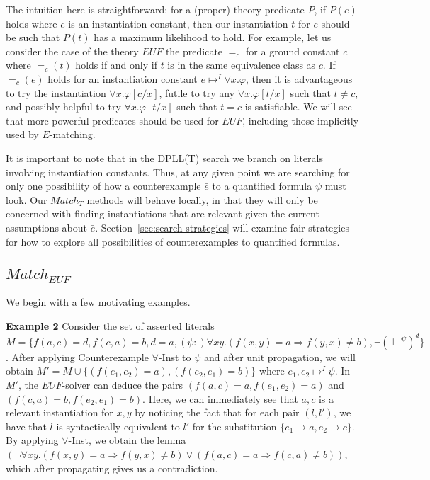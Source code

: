 \documentclass{llncs}
\begin{document}
The intuition here is straightforward: for a (proper) theory predicate $P$, if $P(e)$ holds where $e$ is an instantiation constant, then our instantiation $t$ for $e$ should be such that $P( t )$ has a maximum likelihood to hold.
For example, let us consider the case of the theory $EUF$ the predicate $=_c$ for a ground constant $c$ where $=_c( t )$ holds if and only if $t$ is in the same equivalence class as $c$.
If $=_c( e )$ holds for an instantiation constant $e \mapsto^I \forall x. \varphi$, then it is advantageous to try the instantiation $\forall x. \varphi[c/x]$, futile to try any $\forall x. \varphi[t/x]$ such that $t \neq c$, and possibly helpful to try $\forall x. \varphi[t/x]$ such that $t = c$ is satisfiable.
We will see that more powerful predicates should be used for $EUF$, including those implicitly used by $E$-matching.

It is important to note that in the DPLL(T) search we branch on literals involving instantiation constants.
Thus, at any given point we are searching for only one possibility of how a counterexample $\bar{e}$ to a quantified formula $\psi$ must look.
Our $Match_T$ methods will behave locally, in that they will only be concerned with finding instantiations that are relevant given the current assumptions about $\bar{e}$.
Section~\ref{sec:search-strategies} will examine fair strategies for how to explore all possibilities of counterexamples to quantified formulas.

\subsection{$Match_{EUF}$}

We begin with a few motivating examples.

{\bf Example 2}
Consider the set of asserted literals $M = \{ f( a, c ) = d, f( c, a ) = b, d = a, (\psi :) \forall xy. (f( x, y ) = a \Rightarrow f( y, x ) \neq b), \neg ( \bot^{\neg \psi} )^d \}$.
After applying Counterexample $\forall$-Inst to $\psi$ and after unit propagation, we will obtain $M' = M \cup \{ (f( e_1, e_2 ) = a), (f( e_2, e_1 ) = b) \}$ where $e_1, e_2 \mapsto^I \psi$.
In $M'$, the $EUF$-solver can deduce the pairs $( f( a, c ) = a, f( e_1, e_2 ) = a )$ and $( f( c, a ) = b,  f( e_2, e_1 ) = b )$.
Here, we can immediately see that $a, c$ is a relevant instantiation for $x, y$ by noticing the fact that for each pair $( l, l')$, we have that $l$ is syntactically equivalent to $l'$ for the substitution $\{ e_1 \rightarrow a, e_2 \rightarrow c \}$.
By applying $\forall$-Inst, we obtain the lemma $(\neg \forall xy. (f( x, y ) = a \Rightarrow f( y, x ) \neq b) \vee ( f( a, c ) = a \Rightarrow f( c, a ) \neq b ))$, which after propagating gives us a contradiction. \\
\end{document}

